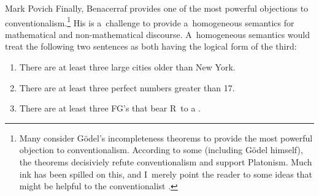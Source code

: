 \begin{artengenv}{Mark Povich}
Finally, Benacerraf
\parencite*[][]{benacerraf_mathematical_1973} %
 provides one of the most powerful objections to conventionalism.\footnote{Many consider Gödel's incompleteness theorems to provide the most powerful objection to conventionalism. According to some (including Gödel himself), the theorems decisiviely refute conventionalism and support Platonism. Much ink has been spilled on this, and I~merely point the reader to some ideas that might be helpful to the conventionalist 
\parencites[][]{moore_more_1999}[][]{floyd_note_2000}[][]{stalnaker_considering_2001}[][]{awodey_how_2004}[][]{berto_goparadox_2009}[][]{lampert_wittgenstein_2018}[][]{warren_shadows_2020}. %
 } His is a~challenge to provide a~homogeneous semantics for mathematical and non-mathematical discourse. A~homogeneous semantics would treat the following two sentences as both having the logical form of the third:
\begin{enumerate}
\item There are at least three large cities older than New York.
\item There are at least three perfect numbers greater than 17.
\item There are at least three FG's that bear R~to a
\parencite[][p.663]{benacerraf_mathematical_1973}.%
\end{enumerate}



\end{artengenv}
